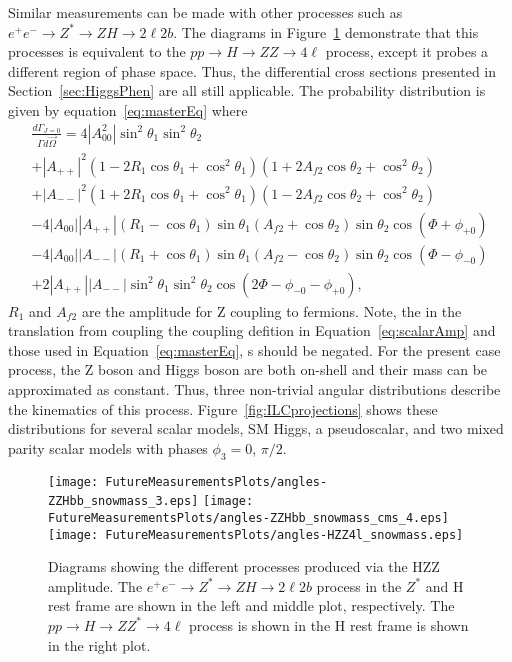 Similar measurements can be made with other processes such as
$e^+e^-\to Z^*\to ZH \to 2\ell2b$.  The diagrams in 
Figure~\ref{fig:HZZprocesses} demonstrate that 
this processes is equivalent to the $pp\to H\to ZZ\to4\ell$
process, except it probes a different region of phase space.
Thus, the differential cross sections
presented in Section~\ref{sec:HiggsPhen} are all still applicable.
The probability distribution is given by equation~\ref{eq:masterEq}
where
\begin{equation}
\begin{split}
\frac{d\Gamma_{J=0}}{\Gamma d\vec{\Omega}} = 4|A_{00}^2|\sin^2\theta_1\sin^2\theta_2 \\
+|A_{++}|^2(1-2R_1\cos\theta_1+\cos^2\theta_1)(1+2A_{f2}\cos\theta_2+\cos^2\theta_2)\\
+|A_{--}|^2(1+2R_1\cos\theta_1+\cos^2\theta_1)(1-2A_{f2}\cos\theta_2+\cos^2\theta_2) \\
-4|A_{00}||A_{++}|(R_1-\cos\theta_1)\sin\theta_1(A_{f2}+\cos\theta_2)\sin\theta_2\cos(\Phi+\phi_{+0}) \\
-4|A_{00}||A_{--}|(R_1+\cos\theta_1)\sin\theta_1(A_{f2}-\cos\theta_2)\sin\theta_2\cos(\Phi-\phi_{-0}) \\
+2|A_{++}||A_{--}|\sin^2\theta_1\sin^2\theta_2\cos(2\Phi-\phi_{-0}-\phi_{+0}),
\end{split}
\end{equation}
$R_1$ and $A_{f2}$ are the amplitude for Z coupling to fermions.  
Note, the in the translation from coupling the
coupling defition in Equation~\ref{eq:scalarAmp} and those 
used in Equation~\ref{eq:masterEq},  s should be negated.
For the present case process, the Z boson and Higgs boson are
both on-shell 
and their mass can be approximated as constant. 
Thus, three non-trivial angular distributions describe 
the kinematics of this process. Figure~\ref{fig:ILCprojections}
shows these distributions for several scalar models, SM Higgs,
a pseudoscalar, and two mixed parity scalar models
with phases $\phi_3=0$, $\pi/2$.  

\begin{figure}
\begin{center}
\texttt{[image: FutureMeasurementsPlots/angles-ZZHbb\_snowmass\_3.eps]}
\texttt{[image: FutureMeasurementsPlots/angles-ZZHbb\_snowmass\_cms\_4.eps]}
\texttt{[image: FutureMeasurementsPlots/angles-HZZ4l\_snowmass.eps]}
\caption{Diagrams showing the different processes produced
via the HZZ amplitude.  The $e^+e^-\to Z^*\to ZH\to 2\ell2b$ process
in the $Z^*$ and H rest frame are shown in the left and middle
plot, respectively.  The $pp\to H\to ZZ^*\to 4\ell$ process
is shown in the H rest frame is shown in the right plot.}
\label{fig:HZZprocesses}
\end{center}
\end{figure}

